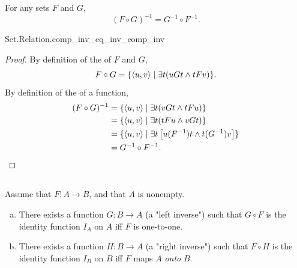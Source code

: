 \documentclass{report}
\begin{document}
  \begin{theorem}[3I]
    For any sets $F$ and $G$, $$(F \circ G)^{-1} = G^{-1} \circ F^{-1}.$$
  \end{theorem}

    {Set.Relation.comp\_inv\_eq\_inv\_comp\_inv}

  \begin{proof}
    By definition of the  of $F$ and $G$,
      $$F \circ G = \{\left< u, v \right> \mid \exists t(uGt \land tFv)\}.$$
    By definition of the  of a function,
      \begin{align*}
        (F \circ G)^{-1}
          & = \{\left< u, v \right> \mid \exists t (vGt \land tFu)\} \\
          & = \{\left< u, v \right> \mid \exists t (tFu \land vGt)\} \\
          & = \{\left< u, v \right> \mid
            \exists t \left[ u(F^{-1})t \land t(G^{-1})v \right]\} \\
          & = G^{-1} \circ F^{-1}.
      \end{align*}
  \end{proof}

\subsection{}%

  \begin{theorem}[3J]
    Assume that $F \colon A \rightarrow B$, and that $A$ is nonempty.
    \begin{enumerate}[(a)]
      \item There exists a function $G \colon B \rightarrow A$
        (a "left inverse") such that $G \circ F$ is the identity function $I_A$
        on $A$ iff $F$ is one-to-one.
      \item There exists a function $H \colon B \rightarrow A$
        (a "right inverse") such that $F \circ H$ is the identity function $I_B$
        on $B$ iff $F$ maps $A$ \textit{onto} $B$.
    \end{enumerate}
  \end{theorem}
\end{document}
